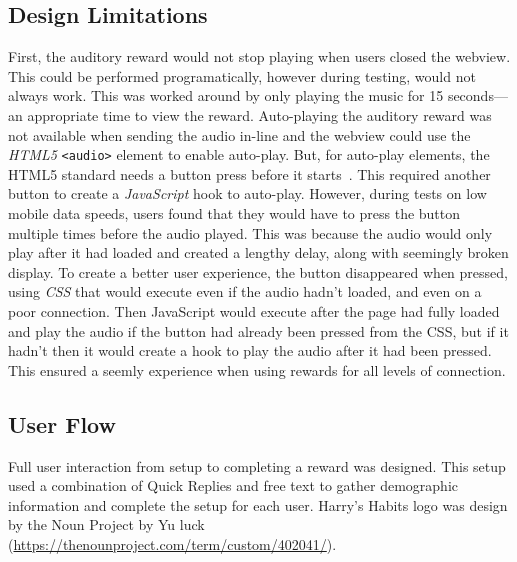 \subsection*{Design Limitations}
First, the auditory reward would not stop playing when users closed the webview. This could be performed programatically, however during testing, would not always work. This was worked around by only playing the music for 15 seconds---an appropriate time to view the reward. Auto-playing the auditory reward was not available when sending the audio in-line and the webview could use the \textit{HTML5} \verb|<audio>| element to enable auto-play.
But, for auto-play elements, the HTML5 standard needs a button press before it starts~\cite{mozilla_autoplay}.
This required another button to create a \textit{JavaScript} hook to auto-play.
However, during tests on low mobile data speeds, users found that they would have to press the button multiple times before the audio played.
This was because the audio would only play after it had loaded and created a lengthy delay, along with seemingly broken display.
To create a better user experience, the button disappeared when pressed, using \textit{CSS} that would execute even if the audio hadn't loaded, and even on a poor connection.
Then JavaScript would execute after the page had fully loaded and play the audio if the button had already been pressed from the CSS, but if it hadn't then it would create a hook to play the audio after it had been pressed.
This ensured a seemly experience when using rewards for all levels of connection.


\subsection{User Flow} \label{user_flow}
Full user interaction from setup to completing a reward was designed. This setup used a combination of Quick Replies and free text to gather demographic information and complete the setup for each user. Harry's Habits logo was design by the Noun Project by Yu luck (\url{https://thenounproject.com/term/custom/402041/}).

